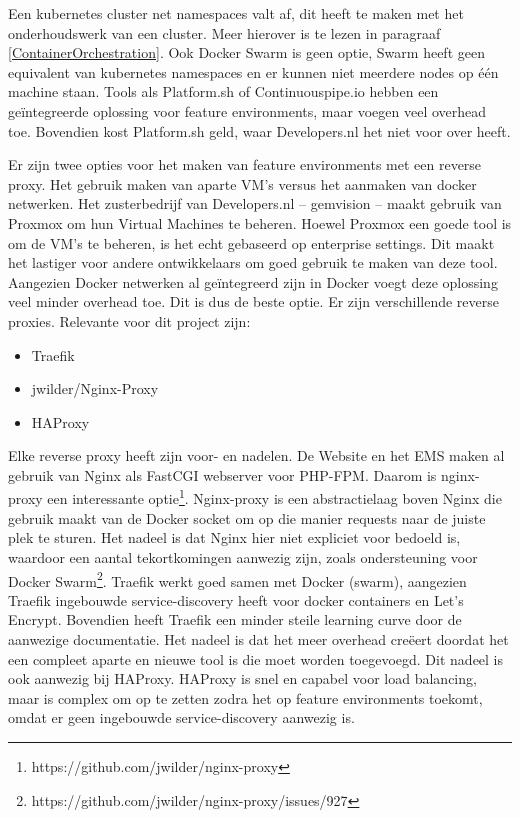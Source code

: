 Een kubernetes cluster net namespaces valt af, dit heeft te maken met het onderhoudswerk van een cluster. Meer hierover is te lezen in paragraaf \ref{ContainerOrchestration}. Ook Docker Swarm is geen optie, Swarm heeft geen equivalent van kubernetes namespaces en er kunnen niet meerdere nodes op één machine staan. Tools als Platform.sh of Continuouspipe.io hebben een geïntegreerde oplossing voor feature environments, maar voegen veel overhead toe. Bovendien kost Platform.sh geld, waar Developers.nl het niet voor over heeft.

Er zijn twee opties voor het maken van feature environments met een reverse proxy. Het gebruik maken van aparte VM's versus het aanmaken van docker netwerken. Het zusterbedrijf van Developers.nl -- gemvision -- maakt gebruik van Proxmox om hun Virtual Machines te beheren. Hoewel Proxmox een goede tool is om de VM's te beheren, is het echt gebaseerd op enterprise settings. Dit maakt het lastiger voor andere ontwikkelaars om goed gebruik te maken van deze tool. Aangezien Docker netwerken al geïntegreerd zijn in Docker voegt deze oplossing veel minder overhead toe. Dit is dus de beste optie. Er zijn verschillende reverse proxies. Relevante voor dit project zijn:
\begin{itemize}
	\item Traefik
	\item jwilder/Nginx-Proxy
	\item HAProxy	
\end{itemize}

Elke reverse proxy heeft zijn voor- en nadelen. De Website en het EMS maken al gebruik van Nginx als FastCGI webserver voor PHP-FPM. Daarom is nginx-proxy een interessante optie\footnote{https://github.com/jwilder/nginx-proxy}. Nginx-proxy is een abstractielaag boven Nginx die gebruik maakt van de Docker socket om op die manier requests naar de juiste plek te sturen. Het nadeel is dat Nginx hier niet expliciet voor bedoeld is, waardoor een aantal tekortkomingen aanwezig zijn, zoals ondersteuning voor Docker Swarm\footnote{https://github.com/jwilder/nginx-proxy/issues/927}. Traefik werkt goed samen met Docker (swarm), aangezien Traefik ingebouwde service-discovery heeft voor docker containers en Let's Encrypt. Bovendien heeft Traefik een minder steile learning curve door de aanwezige documentatie. Het nadeel is dat het meer overhead creëert doordat het een compleet aparte en nieuwe tool is die moet worden toegevoegd. Dit nadeel is ook aanwezig bij HAProxy. HAProxy is snel en capabel voor load balancing, maar is complex om op te zetten zodra het op feature environments toekomt, omdat er geen ingebouwde service-discovery aanwezig is. 

